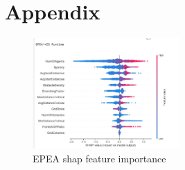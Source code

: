 \documentclass[letterpaper]{article} %
\begin{document}
\section{Appendix}
\begin{figure}[h]
    \centering
    \includegraphics[width=0.5\textwidth]{EPEA.JPG}
    \caption{EPEA shap feature importance}
    \label{fig:3}
\end{figure}
\end{document}
